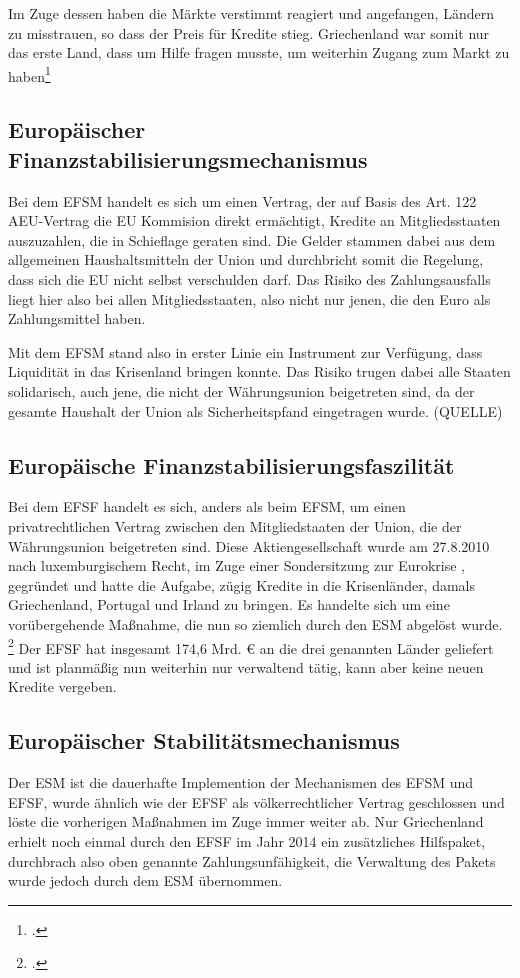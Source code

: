 Im Zuge dessen haben die Märkte verstimmt reagiert und angefangen, Ländern zu misstrauen, so dass der Preis für Kredite stieg. Griechenland war somit nur das erste Land, dass um Hilfe fragen musste, um weiterhin Zugang zum Markt zu haben\footcite[vgl.][]{esm_history_nodate}%

\subsection{Europäischer Finanzstabilisierungsmechanismus}
Bei dem \gls{EFSM} handelt es sich um einen Vertrag, der auf Basis des Art. 122 AEU-Vertrag die \gls{EU} Kommision direkt ermächtigt, Kredite an Mitgliedsstaaten auszuzahlen, die in Schieflage geraten sind.
Die Gelder stammen dabei aus dem allgemeinen Haushaltsmitteln der Union und durchbricht somit die Regelung, dass sich die \gls{EU} nicht selbst verschulden darf. Das Risiko des Zahlungsausfalls liegt hier also bei allen Mitgliedsstaaten, also nicht nur jenen, die den \gls{Euro} als Zahlungsmittel haben.

Mit dem \gls{EFSM} stand also in erster Linie ein Instrument zur Verfügung, dass Liquidität in das Krisenland bringen konnte. Das Risiko trugen dabei alle Staaten solidarisch, auch jene, die nicht der Währungsunion beigetreten sind, da der gesamte Haushalt der Union als Sicherheitspfand eingetragen wurde. (QUELLE)

\subsection{Europäische Finanzstabilisierungsfaszilität}
Bei dem \gls{EFSF} handelt es sich, anders als beim \gls{EFSM}, um einen privatrechtlichen Vertrag zwischen den Mitgliedstaaten der Union, die der Währungsunion beigetreten sind. Diese Aktiengesellschaft wurde am 27.8.2010 nach luxemburgischem Recht, im Zuge einer Sondersitzung zur \glqq{} Eurokrise \grqq, gegründet und hatte die Aufgabe, zügig Kredite in die Krisenländer, damals Griechenland, Portugal und Irland zu bringen. Es handelte sich um eine vorübergehende Maßnahme, die nun so ziemlich
durch den \gls{ESM} abgelöst wurde. \footcite[vgl.][]{} %
Der \gls{EFSF} hat insgesamt 174,6 Mrd. \euro{} an die drei genannten Länder geliefert und ist planmäßig nun weiterhin nur verwaltend tätig, kann aber keine neuen Kredite vergeben.

\subsection{Europäischer Stabilitätsmechanismus}
Der \gls{ESM} ist die dauerhafte Implemention der Mechanismen des \gls{EFSM} und \gls{EFSF}, wurde ähnlich wie der \gls{EFSF} als völkerrechtlicher Vertrag geschlossen und löste die vorherigen Maßnahmen im Zuge immer weiter ab.
Nur Griechenland erhielt noch einmal durch den \gls{EFSF} im Jahr 2014 ein zusätzliches Hilfspaket, durchbrach also oben genannte Zahlungsunfähigkeit, die Verwaltung des Pakets wurde jedoch durch dem \gls{ESM} übernommen.

